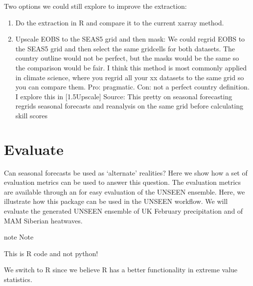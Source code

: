 \documentclass[letterpaper,10pt,english]{sphinxmanual}
\begin{document}
Two options we could still explore to improve the extraction:
\begin{enumerate}
%
\item {} 
Do the extraction in R and compare it to the current xarray method.

\item {} 
Upscale EOBS to the SEAS5 grid and then mask: We could regrid EOBS to the SEAS5 grid and then select the same gridcells for both datasets. The country outline would not be perfect, but the masks would be the same so the comparison would be fair. I think this method is most commonly applied in climate science, where you regrid all your xx datasets to the same grid so you can compare them. Pro: pragmatic. Con: not a perfect country definition. I explore this in {[}1.5Upscale{]} Source: This pretty
 on seasonal forecasting regrids seasonal forecasts and reanalysis on the same grid before calculating skill scores

\end{enumerate}

{
\begin{sphinxVerbatim}[commandchars=\\\{\}]
\llap{\color{nbsphinxin}[ ]:\,\hspace{\fboxrule}\hspace{\fboxsep}}
\end{sphinxVerbatim}
}


\chapter{Evaluate}
\label{\detokenize{Notebooks/3.Evaluate/3.Evaluate:Evaluate}}\label{\detokenize{Notebooks/3.Evaluate/3.Evaluate::doc}}
Can seasonal forecasts be used as ‘alternate’ realities? Here we show how a set of evaluation metrics can be used to answer this question. The evaluation metrics are available through an  for easy evaluation of the UNSEEN ensemble. Here, we illustrate how this package can be used in the UNSEEN workflow. We will evaluate the generated UNSEEN ensemble of UK February precipitation and of MAM Siberian heatwaves.

\begin{sphinxadmonition}{note}{}\unskip
Note

This is R code and not python!

We switch to R since we believe R has a better functionality in extreme value statistics.
\end{sphinxadmonition}
\end{document}
